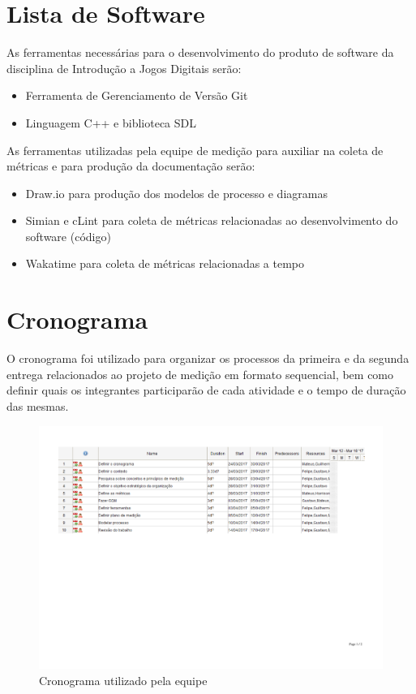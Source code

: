 \section{Lista de Software}
	As ferramentas necessárias para o desenvolvimento do produto de software da disciplina de Introdução a Jogos Digitais serão: 
	\begin{itemize}
		\item Ferramenta de Gerenciamento de Versão Git
		\item Linguagem C++ e biblioteca SDL
	\end{itemize}
	
	As ferramentas utilizadas pela equipe de medição para auxiliar na coleta de métricas e para produção da documentação serão:
	
	\begin{itemize}
		\item Draw.io para produção dos modelos de processo e diagramas
		\item Simian e cLint para coleta de métricas relacionadas ao desenvolvimento do software (código)
		\item Wakatime para coleta de métricas relacionadas a tempo
	\end{itemize}
	
\section{Cronograma}
	O cronograma foi utilizado para organizar os processos da primeira e da segunda entrega relacionados ao projeto de medição em formato sequencial, bem como definir quais os integrantes participarão de cada atividade e o tempo de duração das mesmas.
	\begin{figure}[!htpb]
		\centering
		\includegraphics [scale=0.35]{figuras/processo/cronograma}
		\caption{Cronograma utilizado pela equipe}
	\end{figure}
	\newpage
